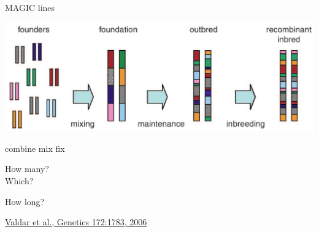 \documentclass[12pt]{article}
\newcommand{\citesize}{\fontsize{14}{18} \selectfont}
\newcommand{\headsize}{\fontsize{35}{35} \selectfont}
\newcommand{\smallsize}{\fontsize{25}{30} \selectfont}
\newcommand{\smallersize}{\fontsize{20}{25} \selectfont}
\begin{document}
\newpage

\addtocounter{page}{-1}

\headsize \color{myyellow}
\hfill \begin{minipage}{5.75in}
\centering
MAGIC lines
\end{minipage}

\vspace{20mm}

\centerline{\includegraphics[width=10in]{Figs/valdar_genet2006.png}}

\smallsize \color{myyellow}
\hspace*{52mm} combine \hspace*{35mm} mix \hspace*{52mm} fix

\smallersize
\color{mywhite}
\vspace{20pt}

\hspace*{6mm}
\begin{minipage}[t]{45mm}
\vspace*{0mm}
\centering

How many? \\[20pt]
Which?
\end{minipage}
\hspace{57mm}
\begin{minipage}[t]{45mm}
\vspace*{0mm}
\centering

How long?
\end{minipage}
\hspace{18mm}
\begin{minipage}[t]{45mm}
\vspace*{0mm}
\centering


\end{minipage}


\vfill

\hfill {\citesize \color{citecolor} \href{http://www.genetics.org/content/172/3/1783.full}{Valdar et al., Genetics 172:1783, 2006}}

\vspace*{5mm}
\end{document}
